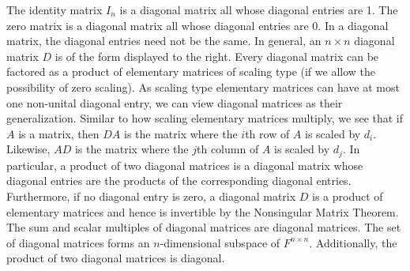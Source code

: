 \begin{center}
\end{center}

The identity matrix $I_n$ is a diagonal matrix all whose diagonal entries are 1. The zero matrix is a diagonal matrix all whose diagonal entries are 0. In a diagonal matrix, the diagonal entries need not be the same.
In general, an $n\times n$ diagonal matrix $D$ is of the form displayed to the right. Every diagonal matrix can be factored as a product of elementary matrices of scaling type (if we allow the possibility of zero scaling). As scaling type  elementary matrices can have at most one non-unital diagonal entry, we can view diagonal matrices as their generalization. Similar to how scaling elementary matrices multiply, we see that if $A$ is a matrix, then $DA$ is the matrix where the $i$th row of $A$ is scaled by $d_i$. Likewise, $AD$ is the matrix where the $j$th column of $A$ is scaled by $d_j$. In particular, a product of two diagonal matrices is a diagonal matrix whose diagonal entries are the products of the corresponding diagonal entries.\\

Furthermore, if no diagonal entry is zero, a diagonal matrix $D$ is a product of elementary matrices and hence is  invertible by %
the Nonsingular Matrix Theorem. The sum and scalar multiples of diagonal matrices are diagonal matrices. The set of diagonal matrices forms an $n$-dimensional subspace of $F^{n\times n}$. Additionally, the product of two diagonal matrices is diagonal. 


